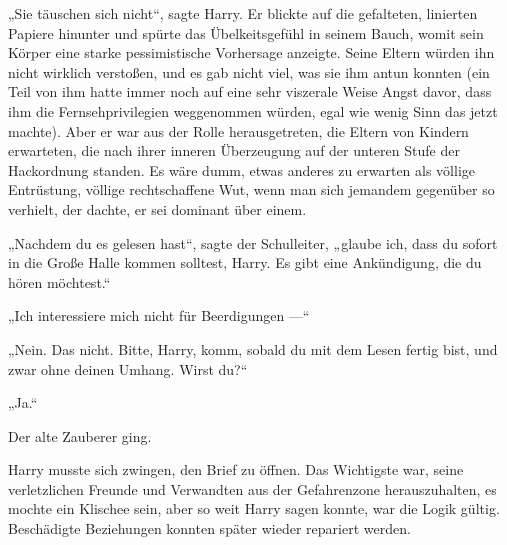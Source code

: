 „Sie täuschen sich nicht“, sagte Harry. Er blickte auf die gefalteten, linierten Papiere hinunter und spürte das Übelkeitsgefühl in seinem Bauch, womit sein Körper eine starke pessimistische Vorhersage anzeigte. Seine Eltern würden ihn nicht wirklich verstoßen, und es gab nicht viel, was sie ihm antun konnten (ein Teil von ihm hatte immer noch auf eine sehr viszerale Weise Angst davor, dass ihm die Fernsehprivilegien weggenommen würden, egal wie wenig Sinn das jetzt machte). Aber er war aus der Rolle herausgetreten, die Eltern von Kindern erwarteten, die nach ihrer inneren Überzeugung auf der unteren Stufe der Hackordnung standen. Es wäre dumm, etwas anderes zu erwarten als völlige Entrüstung, völlige rechtschaffene Wut, wenn man sich jemandem gegenüber so verhielt, der dachte, er sei dominant über einem.

„Nachdem du es gelesen hast“, sagte der Schulleiter, „glaube ich, dass du sofort in die Große Halle kommen solltest, Harry. Es gibt eine Ankündigung, die du hören möchtest.“

„Ich interessiere mich nicht für Beerdigungen —“

„Nein. Das nicht. Bitte, Harry, komm, sobald du mit dem Lesen fertig bist, und zwar ohne deinen Umhang. Wirst du?“

„Ja.“

Der alte Zauberer ging.

Harry musste sich zwingen, den Brief zu öffnen. Das Wichtigste war, seine verletzlichen Freunde und Verwandten aus der Gefahrenzone herauszuhalten, es mochte ein Klischee sein, aber so weit Harry sagen konnte, war die Logik gültig. Beschädigte Beziehungen konnten später wieder repariert werden.


